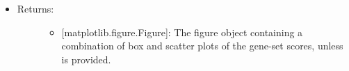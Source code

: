 \documentclass[letterpaper,10pt,english]{sphinxmanual}
\begin{document}
\begin{fulllineitems}
\begin{itemize}
\begin{description}
\begin{itemize}
\end{itemize}

\end{description}

\item {} \begin{description}
\item[{Returns:}] \leavevmode\begin{itemize}
\item {} 
{[}matplotlib.figure.Figure{]}: The figure object containing a
combination of box and scatter plots of the gene-set scores,
unless  is provided.

\end{itemize}

\end{description}

\end{itemize}

\end{fulllineitems}

\end{document}
